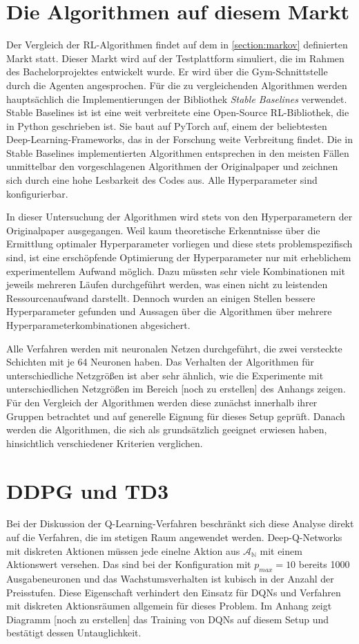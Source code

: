 \section{Die Algorithmen auf diesem Markt}
Der Vergleich der RL-Algorithmen findet auf dem in \ref{section:markov} definierten Markt statt.
Dieser Markt wird auf der Testplattform simuliert, die im Rahmen des Bachelorprojektes entwickelt wurde.
Er wird über die Gym-Schnittstelle durch die Agenten angesprochen.
Für die zu vergleichenden Algorithmen werden hauptsächlich die Implementierungen der Bibliothek \textit{Stable Baselines} verwendet. \cite{stable-baselines}
Stable Baselines ist ist eine weit verbreitete eine Open-Source RL-Bibliothek, die in Python geschrieben ist.
Sie baut auf PyTorch auf, einem der beliebtesten Deep-Learning-Frameworks, das in der Forschung weite Verbreitung findet. \cite{NEURIPS2019_9015}
Die in Stable Baselines implementierten Algorithmen entsprechen in den meisten Fällen unmittelbar den vorgeschlagenen Algorithmen der Originalpaper und zeichnen sich durch eine hohe Lesbarkeit des Codes aus.
Alle Hyperparameter sind konfigurierbar.

In dieser Untersuchung der Algorithmen wird stets von den Hyperparametern der Originalpaper ausgegangen.
Weil kaum theoretische Erkenntnisse über die Ermittlung optimaler Hyperparameter vorliegen und diese stets problemspezifisch sind, ist eine erschöpfende Optimierung der Hyperparameter nur mit erheblichem experimentellem Aufwand möglich.
Dazu müssten sehr viele Kombinationen mit jeweils mehreren Läufen durchgeführt werden, was einen nicht zu leistenden Ressourcenaufwand darstellt.
Dennoch wurden an einigen Stellen bessere Hyperparameter gefunden und Aussagen über die Algorithmen über mehrere Hyperparameterkombinationen abgesichert.

Alle Verfahren werden mit neuronalen Netzen durchgeführt, die zwei versteckte Schichten mit je 64 Neuronen haben.
Das Verhalten der Algorithmen für unterschiedliche Netzgrößen ist aber sehr ähnlich, wie die Experimente mit unterschiedlichen Netzgrößen im Bereich [noch zu erstellen] des Anhangs zeigen.
Für den Vergleich der Algorithmen werden diese zunächst innerhalb ihrer Gruppen betrachtet und auf generelle Eignung für dieses Setup geprüft.
Danach werden die Algorithmen, die sich als grundsätzlich geeignet erwiesen haben, hinsichtlich verschiedener Kriterien verglichen.

\section{DDPG und TD3}
Bei der Diskussion der Q-Learning-Verfahren beschränkt sich diese Analyse direkt auf die Verfahren, die im stetigen Raum angewendet werden.
Deep-Q-Networks mit diskreten Aktionen müssen jede einelne Aktion aus $\mathcal{A_\mathbb{N}}$ mit einem Aktionswert versehen.
Das sind bei der Konfiguration mit $p_{max}=10$ bereits 1000 Ausgabeneuronen und das Wachstumsverhalten ist kubisch in der Anzahl der Preisstufen.
Diese Eigenschaft verhindert den Einsatz für DQNs und Verfahren mit diskreten Aktionsräumen allgemein für dieses Problem.
Im Anhang zeigt Diagramm [noch zu erstellen] das Training von DQNs auf diesem Setup und bestätigt dessen Untauglichkeit.


